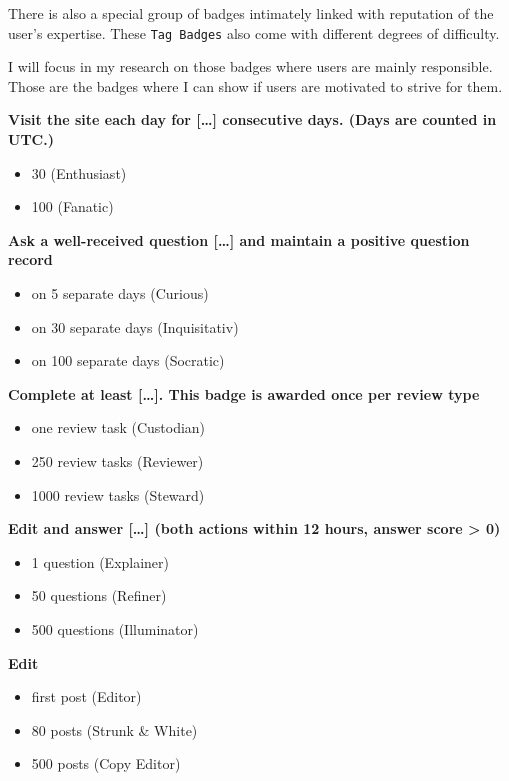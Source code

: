 \documentclass[]{book}
\providecommand{\tightlist}{%
  \setlength{\itemsep}{0pt}\setlength{\parskip}{0pt}}
\theoremstyle{definition}
\theoremstyle{definition}
\theoremstyle{definition}
\theoremstyle{remark}
\begin{document}
There is also a special group of badges intimately linked with
reputation of the user's expertise. These \texttt{Tag\ Badges} also come
with different degrees of difficulty.

I will focus in my research on those badges where users are mainly
responsible. Those are the badges where I can show if users are
motivated to strive for them.

\textbf{Visit the site each day for {[}\ldots{}{]} consecutive days.
(Days are counted in UTC.)}

\begin{itemize}
\tightlist
\item
  30 (Enthusiast)
\item
  100 (Fanatic)
\end{itemize}

\textbf{Ask a well-received question {[}\ldots{}{]} and maintain a
positive question record}

\begin{itemize}
\tightlist
\item
  on 5 separate days (Curious)
\item
  on 30 separate days (Inquisitativ)
\item
  on 100 separate days (Socratic)
\end{itemize}

\textbf{Complete at least {[}\ldots{}{]}. This badge is awarded once per
review type}

\begin{itemize}
\tightlist
\item
  one review task (Custodian)
\item
  250 review tasks (Reviewer)
\item
  1000 review tasks (Steward)
\end{itemize}

\textbf{Edit and answer {[}\ldots{}{]} (both actions within 12 hours,
answer score \textgreater{} 0)}

\begin{itemize}
\tightlist
\item
  1 question (Explainer)
\item
  50 questions (Refiner)
\item
  500 questions (Illuminator)
\end{itemize}

\textbf{Edit}

\begin{itemize}
\tightlist
\item
  first post (Editor)
\item
  80 posts (Strunk \& White)
\item
  500 posts (Copy Editor)
\end{itemize}
\end{document}
